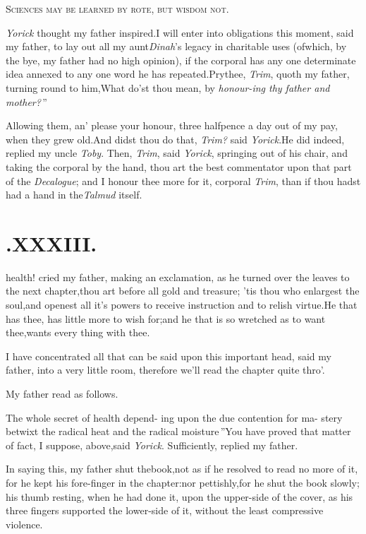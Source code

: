 \documentclass{article}
\begin{document}
\tsk \textsc{Sciences may be learned by rote, but wisdom not}.


\textit{Yorick} thought my father inspired.\tsk I will enter into obligations
this moment, said my father, to lay out all my aunt\break \textit{Dinah}’s legacy
in charitable uses (of\break which, by the bye, my father had no high opinion), if
the corporal has any one determinate idea annexed to any one word he has
repeated.\tsk Prythee, \textit{Trim}, quoth my father, turning round to
him,\break\tsk What do’st thou mean, by
\lqq\textit{honour-\break\lqq ing thy father and mother?}\,”


Allowing them, an’ please your ho\-nour, three halfpence a
day out of my pay, when they grew old.\tsk And didst thou do
that, \textit{Trim?} said \textit{Yorick}.\tsk He did indeed, replied
my uncle \textit{Toby}.\tsk\break
Then, \textit{Trim}, said \textit{Yorick}, springing out\break
of his chair, and taking the corporal by\break
the hand, thou art the best commentator upon that part of the
\textit{Decalogue}; and I honour thee more for it, corporal \textit{Trim}, than
if thou hadst had a hand in the\break\textit{Talmud} itself.

\section{.\enspace  XXXIII.}

 health! cried my father,
making an exclamation, as he\break
turned over the leaves to the next
chapter,\tsk thou art before all gold and treasure; ’tis thou who
enlargest the soul,\tsk and openest all it’s powers to receive
instruction and to relish virtue.\tsk He that has thee, has
little more to wish for;\tsk and he that is so wretched as to
want thee,\tsk wants every thing with thee.\etp

I have concentrated all that can be said upon this important
head, said my father, into a very little room, therefore
we’ll read the chapter quite thro’.

My father read as follows.

\indent\lqq The whole secret of health depend-\break
\lqq ing upon the due contention for ma-\break
\lqq stery betwixt the radical heat and the\break
\lqq radical moisture\,”\tsk You have proved
that matter of fact, I suppose, above,\break said \textit{Yorick}. Sufficiently,
replied my father.


In saying this, my father shut the\break book,\tsk not as if he resolved to read no
more of it, for he kept his fore-finger in the chapter:\tsh nor pettishly,\tsk for
he shut the book slowly; his thumb resting, when he had done it, upon the upper-side
of the cover, as his three fingers supported the lower-side of it, without the least
compressive violence.\tsh{}
\end{document}
